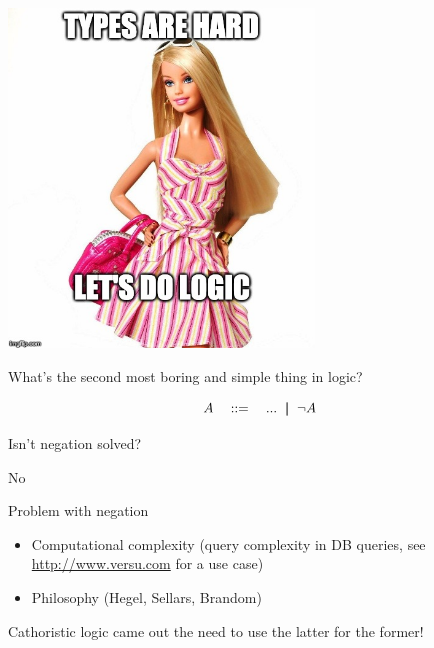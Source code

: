 \begin{frame}
\includegraphics[height=9cm]{images/barbie1.jpg}  
\end{frame}



\begin{frame}
What's the  second most boring and simple thing in logic?

\pause
\VSPACE

\[
   A \quad ::= \quad ... \ \mid\hspace{-3.0pt}\mid \  \neg A
\]

\end{frame}

\begin{frame}{  Isn't negation solved?}

  \pause
  \VSPACE
  No
\end{frame}

\begin{frame}{Problem with negation}
    \pause
  \begin{itemize}

    \item Computational complexity (query complexity in DB queries, see \url{http://www.versu.com} for a use case)

    \item Philosophy (Hegel, Sellars, Brandom)

  \end{itemize}

  \VSPACE
  \pause
  Cathoristic logic came out the need to use the latter for the former!
\end{frame}

